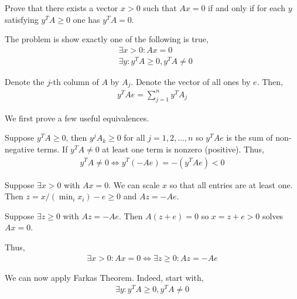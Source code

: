 \documentclass[10pt]{article}
\begin{document}
\maketitle



\begin{problem}
    Prove that there exists a vector \( x>0 \) such that \( Ax=0 \) if and only if for each \( y \) satisfying \( y^TA \geq 0 \) one has \( y^TA = 0 \).
\end{problem}

\begin{solution}

The problem is show exactly one of the following is true,
\begin{align*}
    &\exists x > 0: Ax =0 \\
    &\exists y: y^TA \geq 0, y^TA \neq 0
\end{align*}

Denote the \( j \)-th column of \( A \) by \( A_j \). Denote the vector of all ones by \( e \). Then, 
\begin{align*}
    y^TAe = \sum_{j=1}^{n} y^TA_j
\end{align*}

We first prove a few useful equivalences.

Suppose \( y^TA \geq 0 \), then \( y^jA_k \geq 0 \) for all \( j=1,2,\ldots,n \) so \( y^TAe \) is the sum of non-negative terms. If \( y^TA \neq 0  \) at least one term is nonzero (positive). 
Thus,
\begin{align*}
    y^TA \neq 0 \Longleftrightarrow y^T(-Ae) = -(y^TAe) < 0
\end{align*}

Suppose \( \exists x > 0 \) with \( Ax = 0 \). We can scale \( x \) so that all entries are at least one. Then \( z= x/(\min_{i}{x_i}) - e \geq 0 \) and \( Az=-Ae \).

Suppose \( \exists z\geq 0 \) with \( Az = -Ae \). Then \( A(z+e)=0 \) so \( x=z+e > 0 \) solves \( Ax=0 \).

Thus,
\begin{align*}
    \exists x >0:Ax = 0 \Longleftrightarrow \exists z\geq 0: Az = -Ae
\end{align*}

\vspace{1em}
We can now apply Farkas Theorem. 
Indeed, start with,
\begin{align*}
    \exists y : y^TA \geq 0, y^TA \neq 0
\end{align*}


\end{solution}
\end{document}

